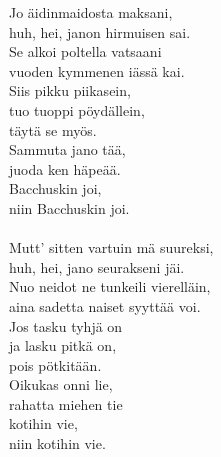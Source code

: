 
            Jo äidinmaidosta maksani,  \\
            huh, hei, janon hirmuisen sai.  \\
            Se alkoi poltella vatsaani  \\
            vuoden kymmenen iässä kai.  \\
            Siis pikku piikasein,  \\
            tuo tuoppi pöydällein,  \\
            täytä se myös. \\
            Sammuta jano tää,  \\
            juoda ken häpeää.  \\
            Bacchuskin joi, \\
            niin Bacchuskin joi. \\
\hspace{10mm} \\
            Mutt' sitten vartuin mä suureksi, \\
            huh, hei, jano seurakseni jäi.  \\
            Nuo neidot ne tunkeili vierelläin,  \\
            aina sadetta naiset syyttää voi.  \\
            Jos tasku tyhjä on \\
            ja lasku pitkä on,  \\
            pois pötkitään.  \\
            Oikukas onni lie,  \\
            rahatta miehen tie  \\
            kotihin vie,  \\
            niin kotihin vie. \\
